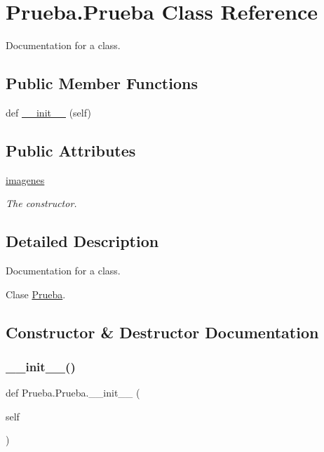 \hypertarget{class_prueba_1_1_prueba}{}\section{Prueba.\+Prueba Class Reference}
\label{class_prueba_1_1_prueba}


Documentation for a class.  


\subsection*{Public Member Functions}
\begin{DoxyCompactItemize}
\item 
def \mbox{\hyperlink{class_prueba_1_1_prueba_a859d4d75bdd38a251809249b0a815551}{\+\_\+\+\_\+init\+\_\+\+\_\+}} (self)
\end{DoxyCompactItemize}
\subsection*{Public Attributes}
\begin{DoxyCompactItemize}
\item 
\mbox{\hyperlink{class_prueba_1_1_prueba_af266bba2aecfbc1220e982cc10e3ac0a}{imagenes}}
\begin{DoxyCompactList}\small\item\em The constructor. \end{DoxyCompactList}\end{DoxyCompactItemize}


\subsection{Detailed Description}
Documentation for a class. 

Clase \mbox{\hyperlink{class_prueba_1_1_prueba}{Prueba}}. 

\subsection{Constructor \& Destructor Documentation}
\mbox{\label{class_prueba_1_1_prueba_a859d4d75bdd38a251809249b0a815551}} 
\subsubsection{\texorpdfstring{\+\_\+\+\_\+init\+\_\+\+\_\+()}{\_\_init\_\_()}}
{\footnotesize\ttfamily def Prueba.\+Prueba.\+\_\+\+\_\+init\+\_\+\+\_\+ (\begin{DoxyParamCaption}\item[{}]{self }\end{DoxyParamCaption})}



